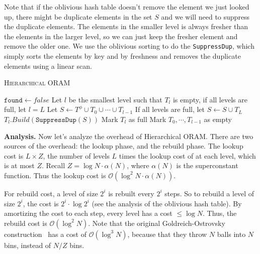 Note that if the oblivious hash table doesn't remove the element we just looked up, there might be duplicate elements in the set $S$ and we will need to suppress the duplicate elements.
The elements in the smaller level is always fresher than the elements in the larger level, so we can just keep the fresher element and remove the older one.
We use the oblivious sorting to do the \texttt{SuppressDup}, which simply sorts the elements by key and by freshness and removes the duplicate elements using a linear scan.


\begin{algorithm}[h]
  \caption{\textsc{Hierarchical ORAM}}
  \label{alg:oram}
 
 $\texttt{found} \leftarrow false$\;
 Let $l$ be the smallest level such that $T_l$ is empty, if all levels are full, let $l = L$\;
 Let $S \leftarrow T^\phi \cup T_0 \cup \cdots \cup T_{l-1}$\;
 If all levels are full, let $S \leftarrow S \cup T_L$\;
 $T_l.Build(\texttt{SuppressDup}(S))$\;
 Mark $T_l$ as full\;
 Mark $T_0, \cdots, T_{l-1}$ as empty\;
 \end{algorithm}

\textbf{Analysis.} Now let's analyze the overhead of Hierarchical ORAM. There are two sources of the overhead: the lookup phase, and the rebuild phase.
The lookup cost is $L \times Z$, the number of levels $L$ times the lookup cost of at each level, which is at most $Z$. Recall $Z = \log N \cdot \alpha(N)$, where $\alpha(N)$ is the superconstant function. Thus the lookup cost is $\mathcal{O}(\log^2 N \cdot \alpha(N))$.

For rebuild cost, a level of size $2^i$ is rebuilt every $2^i$ steps.
So to rebuild a level of size $2^i$, the cost is $2^i \cdot \log 2^i$ (see the analysis of the oblivious hash table).
By amortizing the cost to each step, every level has a cost $\leq \log N$.
Thus, the rebuild cost is $\mathcal{O}(\log^2 N)$.
Note that the original Goldreich-Ostrovsky construction~\cite{10.1145/233551.233553} has a cost of $\mathcal{O}(\log^3 N)$, because that they throw $N$ balls into $N$ bins, instead of $N/Z$ bins.